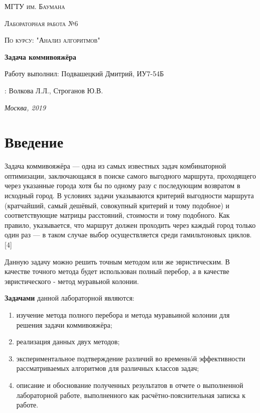 \documentclass[12pt]{report}
\begin{document}
	
	
	\begin{titlepage}
		\centering
		{\scshape\LARGE МГТУ им. Баумана \par}
		\vspace{3cm}
		{\scshape\Large Лабораторная работа №6\par}
		\vspace{0.5cm}	
		{\scshape\Large По курсу: "Анализ алгоритмов"\par}
		\vspace{1.5cm}
		{\huge\bfseries Задача коммивояжёра\par}
		\vspace{2cm}
		\Large Работу выполнил: Подвашецкий Дмитрий, ИУ7-54Б\par
		\vspace{0.5cm}
		:  Волкова Л.Л., Строганов Ю.В.\par
		
		\vfill
		\large \textit {Москва, 2019} \par
	\end{titlepage}
	
	\tableofcontents
	
	\newpage
	\chapter*{Введение}
	
	Задача коммивояжёра — одна из самых известных задач комбинаторной оптимизации, заключающаяся в поиске самого выгодного маршрута, проходящего через указанные города хотя бы по одному разу с последующим возвратом в исходный город. В условиях задачи указываются критерий выгодности маршрута (кратчайший, самый дешёвый, совокупный критерий и тому подобное) и соответствующие матрицы расстояний, стоимости и тому подобного. Как правило, указывается, что маршрут должен проходить через каждый город только один раз — в таком случае выбор осуществляется среди гамильтоновых циклов.[4]
	
	Данную задачу можно решить точным методом или же эвристическим. В качестве точного метода будет использован полный перебор, а в качестве эвристического - метод муравьиой колонии.
	
	\textbf{Задачами} данной лабораторной являются:
	\begin{enumerate}
		\item изучение метода полного перебора и метода муравьиной колонии для решения задачи коммивояжёра;
		\item реализация данных двух методов;
		\item экспериментальное подтверждение различий во временнóй эффективности рассматриваемых алгоритмов для различных классов задач;
		\item описание и обоснование полученных результатов в отчете о выполненной лабораторной
		работе, выполненного как расчётно-пояснительная записка к работе.
	\end{enumerate}
\end{document}

